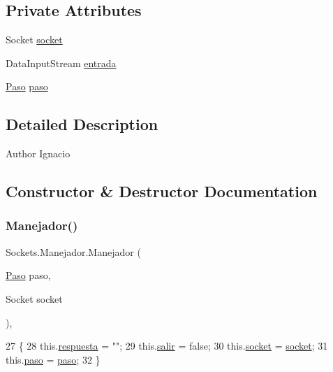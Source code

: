 \subsection*{Private Attributes}
\begin{DoxyCompactItemize}
\item 
Socket \mbox{\hyperlink{class_sockets_1_1_manejador_a71819caa3c23e76fcd4faa94377cae72}{socket}}
\item 
Data\+Input\+Stream \mbox{\hyperlink{class_sockets_1_1_manejador_ac51aaab6667f8f43427bf39f8afb740a}{entrada}}
\item 
\mbox{\hyperlink{class_sockets_1_1_paso}{Paso}} \mbox{\hyperlink{class_sockets_1_1_manejador_a9eebde9281de4525c33c8cf7ee278975}{paso}}
\end{DoxyCompactItemize}


\subsection{Detailed Description}
\begin{DoxyAuthor}{Author}
Ignacio 
\end{DoxyAuthor}


\subsection{Constructor \& Destructor Documentation}
\mbox{\label{class_sockets_1_1_manejador_a074d5730fb98ef489d0af3786f5e58cb}} 
\subsubsection{\texorpdfstring{Manejador()}{Manejador()}}
{\footnotesize\ttfamily Sockets.\+Manejador.\+Manejador (\begin{DoxyParamCaption}\item[{\mbox{\hyperlink{class_sockets_1_1_paso}{Paso}}}]{paso,  }\item[{Socket}]{socket }\end{DoxyParamCaption})\hspace{0.3cm}{\ttfamily [inline]}, {\ttfamily [package]}}


\begin{DoxyCode}
27     \{
28         this.\mbox{\hyperlink{class_sockets_1_1_manejador_a88d7f7ec2ce70bf96c09b715358b1b9b}{respuesta}} = \textcolor{stringliteral}{""};
29         this.\mbox{\hyperlink{class_sockets_1_1_manejador_aa1ef67c0efe69c6b47c193c8d49a84f4}{salir}} = \textcolor{keyword}{false};
30         this.\mbox{\hyperlink{class_sockets_1_1_manejador_a71819caa3c23e76fcd4faa94377cae72}{socket}} = \mbox{\hyperlink{class_sockets_1_1_manejador_a71819caa3c23e76fcd4faa94377cae72}{socket}};
31         this.\mbox{\hyperlink{class_sockets_1_1_manejador_a9eebde9281de4525c33c8cf7ee278975}{paso}} = \mbox{\hyperlink{class_sockets_1_1_manejador_a9eebde9281de4525c33c8cf7ee278975}{paso}};
32     \}
\end{DoxyCode}


